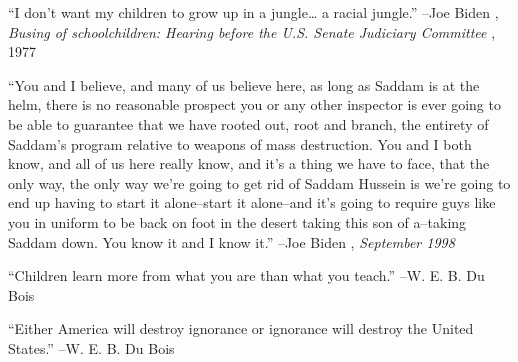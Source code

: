 \documentclass{article}%
\begin{document}
\linebreak%
\vspace{1mm}%
\begin{minipage}{\textwidth}%
\flushleft%
“I don't want my children to grow up in a jungle… a racial jungle.”%
\linebreak%
\vspace{1mm}%
–Joe Biden%
, \textit{Busing of schoolchildren: Hearing before the U.S. Senate Judiciary Committee}%
, 1977%
\linebreak%
\vspace{1mm}%
\end{minipage}%
\linebreak%
\vspace{1mm}%
\begin{minipage}{\textwidth}%
\flushleft%
“You and I believe, and many of us believe here, as long as Saddam is at the helm, there is no reasonable prospect you or any other inspector is ever going to be able to guarantee that we have rooted out, root and branch, the entirety of Saddam's program relative to weapons of mass destruction. You and I both know, and all of us here really know, and it's a thing we have to face, that the only way, the only way we're going to get rid of Saddam Hussein is we're going to end up having to start it alone–start it alone–and it's going to require guys like you in uniform to be back on foot in the desert taking this son of a–taking Saddam down. You know it and I know it.”%
\linebreak%
\vspace{1mm}%
–Joe Biden%
, \textit{September 1998}%
\linebreak%
\vspace{1mm}%
\end{minipage}%
\linebreak%
\vspace{1mm}%
\begin{minipage}{\textwidth}%
\flushleft%
“Children learn more from what you are than what you teach.”%
\linebreak%
\vspace{1mm}%
–W. E. B. Du Bois%
\linebreak%
\vspace{1mm}%
\end{minipage}%
\linebreak%
\vspace{1mm}%
\begin{minipage}{\textwidth}%
\flushleft%
“Either America will destroy ignorance or ignorance will destroy the United States.”%
\linebreak%
\vspace{1mm}%
–W. E. B. Du Bois%
\linebreak%
\vspace{1mm}%
\end{minipage}%
\end{document}
